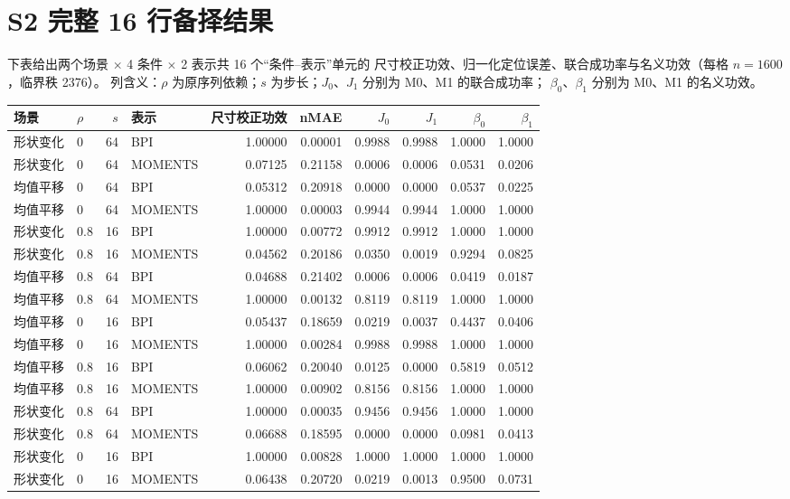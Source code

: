 \documentclass[UTF8,zihao=-4]{ctexart}
\theoremstyle{remark}
\begin{document}
\section*{S2 完整 16 行备择结果}

下表给出两个场景 $\times$ 4 条件 $\times$ 2 表示共 16 个“条件--表示”单元的
尺寸校正功效、归一化定位误差、联合成功率与名义功效（每格 $n=1600$，临界秩 2376）。
列含义：$\rho$ 为原序列依赖；$s$ 为步长；$J_0$、$J_1$ 分别为 M0、M1 的联合成功率；
$\beta_0$、$\beta_1$ 分别为 M0、M1 的名义功效。

\begingroup
\footnotesize
\begin{longtable}{llrlrrrrrr}
\toprule
场景 & $\rho$ & $s$ & 表示 & 尺寸校正功效 & nMAE & $J_0$ & $J_1$ & $\beta_0$ & $\beta_1$\\
\midrule
\endhead
形状变化 & 0 & 64 & BPI & 1.00000 & 0.00001 & 0.9988 & 0.9988 & 1.0000 & 1.0000\\
形状变化 & 0 & 64 & MOMENTS & 0.07125 & 0.21158 & 0.0006 & 0.0006 & 0.0531 & 0.0206\\
均值平移 & 0 & 64 & BPI & 0.05312 & 0.20918 & 0.0000 & 0.0000 & 0.0537 & 0.0225\\
均值平移 & 0 & 64 & MOMENTS & 1.00000 & 0.00003 & 0.9944 & 0.9944 & 1.0000 & 1.0000\\
形状变化 & 0.8 & 16 & BPI & 1.00000 & 0.00772 & 0.9912 & 0.9912 & 1.0000 & 1.0000\\
形状变化 & 0.8 & 16 & MOMENTS & 0.04562 & 0.20186 & 0.0350 & 0.0019 & 0.9294 & 0.0825\\
均值平移 & 0.8 & 64 & BPI & 0.04688 & 0.21402 & 0.0006 & 0.0006 & 0.0419 & 0.0187\\
均值平移 & 0.8 & 64 & MOMENTS & 1.00000 & 0.00132 & 0.8119 & 0.8119 & 1.0000 & 1.0000\\
均值平移 & 0 & 16 & BPI & 0.05437 & 0.18659 & 0.0219 & 0.0037 & 0.4437 & 0.0406\\
均值平移 & 0 & 16 & MOMENTS & 1.00000 & 0.00284 & 0.9988 & 0.9988 & 1.0000 & 1.0000\\
均值平移 & 0.8 & 16 & BPI & 0.06062 & 0.20040 & 0.0125 & 0.0000 & 0.5819 & 0.0512\\
均值平移 & 0.8 & 16 & MOMENTS & 1.00000 & 0.00902 & 0.8156 & 0.8156 & 1.0000 & 1.0000\\
形状变化 & 0.8 & 64 & BPI & 1.00000 & 0.00035 & 0.9456 & 0.9456 & 1.0000 & 1.0000\\
形状变化 & 0.8 & 64 & MOMENTS & 0.06688 & 0.18595 & 0.0000 & 0.0000 & 0.0981 & 0.0413\\
形状变化 & 0 & 16 & BPI & 1.00000 & 0.00828 & 1.0000 & 1.0000 & 1.0000 & 1.0000\\
形状变化 & 0 & 16 & MOMENTS & 0.06438 & 0.20720 & 0.0219 & 0.0013 & 0.9500 & 0.0731\\
\bottomrule
\end{longtable}
\endgroup
\end{document}

